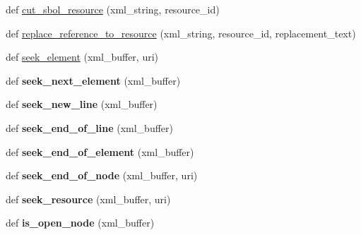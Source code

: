 \begin{DoxyCompactItemize}
\item 
def \hyperlink{namespacesbol_1_1libsbol_a1cbbc8c786f439ba076850e7ab69d6e5}{cut\+\_\+sbol\+\_\+resource} (xml\+\_\+string, resource\+\_\+id)
\item 
def \hyperlink{namespacesbol_1_1libsbol_a10a41aa11da61010612aee8e9ce2f72b}{replace\+\_\+reference\+\_\+to\+\_\+resource} (xml\+\_\+string, resource\+\_\+id, replacement\+\_\+text)
\item 
def \hyperlink{namespacesbol_1_1libsbol_aefc2deaee31dedeb6bc41f6b99344e58}{seek\+\_\+element} (xml\+\_\+buffer, uri)
\item 
def {\bfseries seek\+\_\+next\+\_\+element} (xml\+\_\+buffer)\hypertarget{namespacesbol_1_1libsbol_ac06f1679da62a3a8a47637c027d7d5d2}{}\label{namespacesbol_1_1libsbol_ac06f1679da62a3a8a47637c027d7d5d2}

\item 
def {\bfseries seek\+\_\+new\+\_\+line} (xml\+\_\+buffer)\hypertarget{namespacesbol_1_1libsbol_ab0e40d854144f0b8c5198459e5088a3c}{}\label{namespacesbol_1_1libsbol_ab0e40d854144f0b8c5198459e5088a3c}

\item 
def {\bfseries seek\+\_\+end\+\_\+of\+\_\+line} (xml\+\_\+buffer)\hypertarget{namespacesbol_1_1libsbol_aba8e2d2ac2a11872b9609effba26fcc4}{}\label{namespacesbol_1_1libsbol_aba8e2d2ac2a11872b9609effba26fcc4}

\item 
def {\bfseries seek\+\_\+end\+\_\+of\+\_\+element} (xml\+\_\+buffer)\hypertarget{namespacesbol_1_1libsbol_a0811d5fa5de2b1d81fca56dbbcb5f97a}{}\label{namespacesbol_1_1libsbol_a0811d5fa5de2b1d81fca56dbbcb5f97a}

\item 
def {\bfseries seek\+\_\+end\+\_\+of\+\_\+node} (xml\+\_\+buffer, uri)\hypertarget{namespacesbol_1_1libsbol_a54a4b2b1d37740113274db738d728c07}{}\label{namespacesbol_1_1libsbol_a54a4b2b1d37740113274db738d728c07}

\item 
def {\bfseries seek\+\_\+resource} (xml\+\_\+buffer, uri)\hypertarget{namespacesbol_1_1libsbol_a4f5211baa578f613ac36422ce2491dc6}{}\label{namespacesbol_1_1libsbol_a4f5211baa578f613ac36422ce2491dc6}

\item 
def {\bfseries is\+\_\+open\+\_\+node} (xml\+\_\+buffer)\hypertarget{namespacesbol_1_1libsbol_addda11ab1202c9f49ab28e5408d9dd36}{}\label{namespacesbol_1_1libsbol_addda11ab1202c9f49ab28e5408d9dd36}


\end{DoxyCompactItemize}
